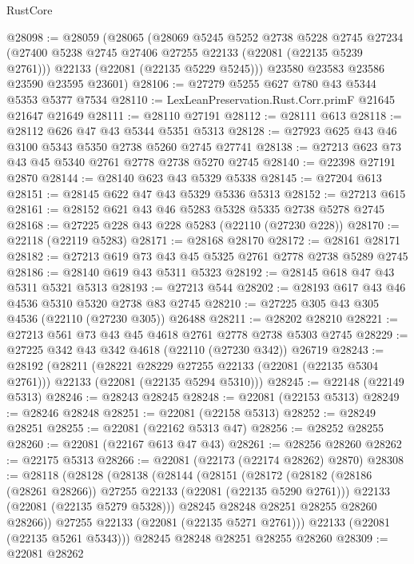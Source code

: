 \begin{lexlean}{RustCore}
\begin{coremodule}
@28098 := @28059
    (@28065
      (@28069
        @5245
        @5252
        @2738
        @5228
        @2745
        @27234
        (@27400 @5238 @2745 @27406 @27255 @22133 (@22081 (@22135 @5239 @2761)))
        @22133
        (@22081 (@22135 @5229 @5245)))
      @23580
      @23583
      @23586
      @23590
      @23595
      @23601)
@28106 := @27279 @5255 @627 @780 @43 @5344 @5353 @5377 @7534
@28110 := LexLeanPreservation.Rust.Corr.primF @21645 @21647 @21649
@28111 := @28110 @27191
@28112 := @28111 @613
@28118 := @28112 @626 @47 @43 @5344 @5351 @5313
@28128 := @27923 @625 @43 @46 @3100 @5343 @5350 @2738 @5260 @2745 @27741
@28138 := @27213 @623 @73 @43 @45 @5340 @2761 @2778 @2738 @5270 @2745
@28140 := @22398 @27191 @2870
@28144 := @28140 @623 @43 @5329 @5338
@28145 := @27204 @613
@28151 := @28145 @622 @47 @43 @5329 @5336 @5313
@28152 := @27213 @615
@28161 := @28152 @621 @43 @46 @5283 @5328 @5335 @2738 @5278 @2745
@28168 := @27225 @228 @43 @228 @5283 (@22110 (@27230 @228))
@28170 := @22118 (@22119 @5283)
@28171 := @28168 @28170
@28172 := @28161 @28171
@28182 := @27213 @619 @73 @43 @45 @5325 @2761 @2778 @2738 @5289 @2745
@28186 := @28140 @619 @43 @5311 @5323
@28192 := @28145 @618 @47 @43 @5311 @5321 @5313
@28193 := @27213 @544
@28202 := @28193 @617 @43 @46 @4536 @5310 @5320 @2738 @83 @2745
@28210 := @27225 @305 @43 @305 @4536 (@22110 (@27230 @305)) @26488
@28211 := @28202 @28210
@28221 := @27213 @561 @73 @43 @45 @4618 @2761 @2778 @2738 @5303 @2745
@28229 := @27225 @342 @43 @342 @4618 (@22110 (@27230 @342)) @26719
@28243 := @28192
    (@28211
      (@28221 @28229 @27255 @22133 (@22081 (@22135 @5304 @2761)))
      @22133
      (@22081 (@22135 @5294 @5310)))
@28245 := @22148 (@22149 @5313)
@28246 := @28243 @28245
@28248 := @22081 (@22153 @5313)
@28249 := @28246 @28248
@28251 := @22081 (@22158 @5313)
@28252 := @28249 @28251
@28255 := @22081 (@22162 @5313 @47)
@28256 := @28252 @28255
@28260 := @22081 (@22167 @613 @47 @43)
@28261 := @28256 @28260
@28262 := @22175 @5313
@28266 := @22081 (@22173 (@22174 @28262) @2870)
@28308 := @28118
    (@28128
      (@28138
        (@28144
          (@28151
            (@28172
              (@28182 (@28186 (@28261 @28266)) @27255 @22133 (@22081 (@22135 @5290 @2761)))
              @22133
              (@22081 (@22135 @5279 @5328)))
            @28245
            @28248
            @28251
            @28255
            @28260
            @28266))
        @27255
        @22133
        (@22081 (@22135 @5271 @2761)))
      @22133
      (@22081 (@22135 @5261 @5343)))
    @28245
    @28248
    @28251
    @28255
    @28260
@28309 := @22081 @28262

\end{coremodule}
\end{lexlean}
